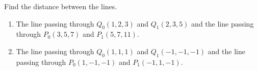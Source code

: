 Find the distance between the lines.

\begin{enumerate}
\item The line passing through $Q_0(1,2,3) $ and $Q_1(2,3,5)$ and the line passing through $P_0(3,5,7)$ and $P_1(5,7,11)$.

\item The line passing through $ Q_0(1,1,1)$ and $Q_1(-1,-1,-1)$ and the line passing through $P_0(1, -1, -1)$ and $P_1(-1,1,-1)$.
\end{enumerate}

\begin{comment}Calculator code solving above problem:
p0:=(3,5,7);
p1:=(5,7,11);
q0:=(1,2,3); 
q1:=(2,3,-5);
u1:=p1-p0;
u2:=q1-q0;
r:=q0-p0;
n:=u1\times u2;
((r n^t)_1)_1 /\sqrt{}(((n n^t)_1)_1) 
\end{comment}